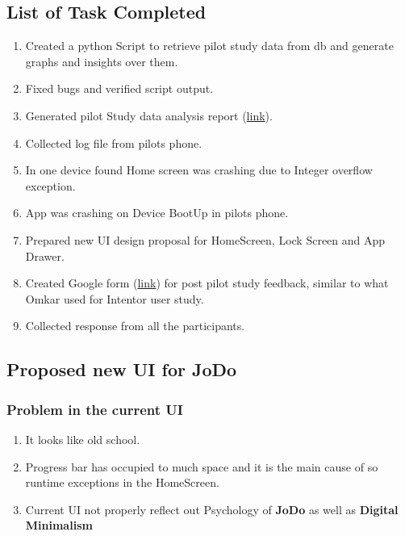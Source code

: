 \documentclass[12pt]{article}
\begin{document}
\subsection{List of Task Completed}
\begin{enumerate}
    \item Created a python Script to retrieve pilot study data from db and generate graphs and insights over them.
    \item Fixed bugs and verified script output.
    \item Generated pilot Study data analysis report (\href{https://drive.google.com/file/d/1GWn26HUfRNxbJ2xH5aLeTd6d8hEtVdlX/view?usp=sharing}{link}).
    \item Collected log file from pilots phone.
    \item In one device found Home screen was crashing due to Integer overflow exception.
    \item App was crashing on Device BootUp in pilots phone.
    \item Prepared new UI design proposal for HomeScreen, Lock Screen and App Drawer.
    \item Created Google form  (\href{https://forms.gle/D1U46AeNB6NzSw1fA}{link}) for post pilot study feedback, similar to what Omkar used for Intentor user study.
    \item Collected response from all the participants.
\end{enumerate}
\subsection{Proposed new UI for JoDo}
\subsubsection{Problem in the current UI}
\begin{enumerate}
    \item It looks like old school.
    \item Progress bar has occupied to much space and it is the main cause of so runtime exceptions in the HomeScreen.
    \item Current UI not properly reflect out Psychology of \textbf{JoDo} as well as \textbf{Digital Minimalism}
\end{enumerate}
\end{document}
